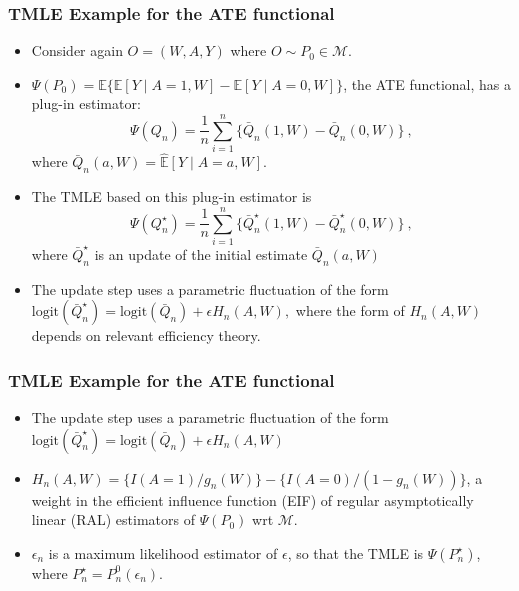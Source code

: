 \documentclass[t]{beamer}
\begin{document}
\begin{frame}
  \frametitle{TMLE Example for the ATE functional}
  \begin{itemize}
    \item Consider again $O = (W, A, Y)$ where $O \sim P_0 \in \mathcal{M}$.
    \item $\Psi(P_0) = \mathbb{E}\{\mathbb{E}[Y \mid A = 1, W] - \mathbb{E}[Y
      \mid A = 0, W]\}$, the ATE functional, has a plug-in estimator:
      $$\Psi(Q_n) = \frac{1}{n}\sum_{i=1}^n\{\bar{Q}_n(1, W) - \bar{Q}_n(0,
      W)\} \ ,$$ where $\bar{Q}_n(a, W) = \hat{\mathbb{E}}[Y \mid A = a, W]$.
    \item The TMLE based on this plug-in estimator is
      $$\Psi(Q_n^{\star}) = \frac{1}{n}\sum_{i=1}^n\{\bar{Q}_n^{\star}(1, W) -
        \bar{Q}_n^{\star}(0, W)\} \ ,$$ where $\bar{Q}_n^{\star}$ is an update
        of the initial estimate $\bar{Q}_n(a, W)$
    \item The update step uses a parametric fluctuation of the form
      $\text{logit}(\bar{Q}_n^{\star}) = \text{logit}(\bar{Q}_n) + \epsilon
      H_n(A,W),$ where the form of $H_n(A,W)$ depends on relevant efficiency
      theory.
  \end{itemize}
\end{frame}

\begin{frame}
  \frametitle{TMLE Example for the ATE functional}
  \begin{itemize}
    \itemsep4pt
    \item The update step uses a parametric fluctuation of the form
      $\text{logit}(\bar{Q}_n^{\star}) = \text{logit}(\bar{Q}_n) + \epsilon
      H_n(A,W)$
    \item $H_n(A,W) = \{I(A = 1) / g_n(W)\} - \{I(A = 0) / (1 - g_n(W))\}$,
      a weight in the efficient influence function (EIF) of regular
      asymptotically linear (RAL) estimators of $\Psi(P_0)$ wrt $\mathcal{M}$.
    \item $\epsilon_n$ is a maximum likelihood estimator of $\epsilon$, so that
      the TMLE is $\Psi(P_n^{\star})$, where $P_n^{\star} = P_n^0(\epsilon_n)$.
  \end{itemize}
\end{frame}
\end{document}
